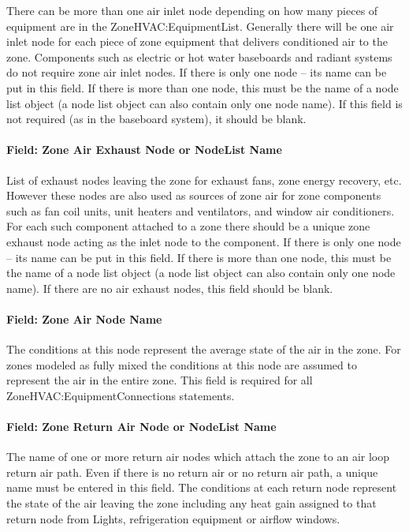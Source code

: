 There can be more than one air inlet node depending on how many pieces of equipment are in the ZoneHVAC:EquipmentList. Generally there will be one air inlet node for each piece of zone equipment that delivers conditioned air to the zone. Components such as electric or hot water baseboards and radiant systems do not require zone air inlet nodes. If there is only one node -- its name can be put in this field. If there is more than one node, this must be the name of a node list object (a node list object can also contain only one node name). If this field is not required (as in the baseboard system), it should be blank.

\paragraph{Field: Zone Air Exhaust Node or NodeList Name}\label{field-zone-air-exhaust-node-or-nodelist-name}

List of exhaust nodes leaving the zone for exhaust fans, zone energy recovery, etc. However these nodes are also used as sources of zone air for zone components such as fan coil units, unit heaters and ventilators, and window air conditioners. For each such component attached to a zone there should be a unique zone exhaust node acting as the inlet node to the component. If there is only one node -- its name can be put in this field. If there is more than one node, this must be the name of a node list object (a node list object can also contain only one node name). If there are no air exhaust nodes, this field should be blank.

\paragraph{Field: Zone Air Node Name}\label{field-zone-air-node-name}

The conditions at this node represent the average state of the air in the zone. For zones modeled as fully mixed the conditions at this node are assumed to represent the air in the entire zone. This field is required for all ZoneHVAC:EquipmentConnections statements.

\paragraph{Field: Zone Return Air Node or NodeList Name}\label{field-zone-return-air-node-or-nodelist-name}

The name of one or more return air nodes which attach the zone to an air loop return air path. Even if there is no return air or no return air path, a unique name must be entered in this field. The conditions at each return node represent the state of the air leaving the zone including any heat gain assigned to that return node from Lights, refrigeration equipment or airflow windows.

